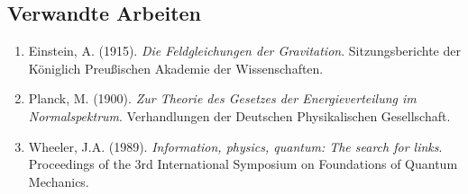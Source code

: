 	\subsection{Verwandte Arbeiten}
	
	\begin{enumerate}
		\item Einstein, A. (1915). \textit{Die Feldgleichungen der Gravitation}. Sitzungsberichte der Königlich Preußischen Akademie der Wissenschaften.
		\item Planck, M. (1900). \textit{Zur Theorie des Gesetzes der Energieverteilung im Normalspektrum}. Verhandlungen der Deutschen Physikalischen Gesellschaft.
		\item Wheeler, J.A. (1989). \textit{Information, physics, quantum: The search for links}. Proceedings of the 3rd International Symposium on Foundations of Quantum Mechanics.
	\end{enumerate}
	